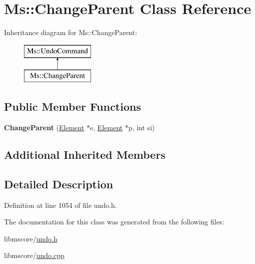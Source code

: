 \hypertarget{class_ms_1_1_change_parent}{}\section{Ms\+:\+:Change\+Parent Class Reference}
\label{class_ms_1_1_change_parent}
Inheritance diagram for Ms\+:\+:Change\+Parent\+:\begin{figure}[H]
\begin{center}
\leavevmode
\includegraphics[height=2.000000cm]{class_ms_1_1_change_parent}
\end{center}
\end{figure}
\subsection*{Public Member Functions}
\begin{DoxyCompactItemize}
\item 
\mbox{\label{class_ms_1_1_change_parent_a74aa1d633f5b8460a6da409e6240649c}} 
{\bfseries Change\+Parent} (\hyperlink{class_ms_1_1_element}{Element} $\ast$e, \hyperlink{class_ms_1_1_element}{Element} $\ast$p, int si)
\end{DoxyCompactItemize}
\subsection*{Additional Inherited Members}


\subsection{Detailed Description}


Definition at line 1054 of file undo.\+h.



The documentation for this class was generated from the following files\+:\begin{DoxyCompactItemize}
\item 
libmscore/\hyperlink{undo_8h}{undo.\+h}\item 
libmscore/\hyperlink{undo_8cpp}{undo.\+cpp}\end{DoxyCompactItemize}
